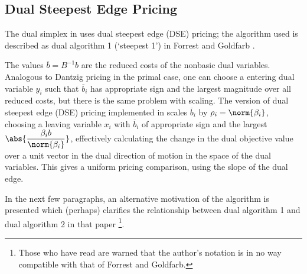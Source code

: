 \subsection{Dual Steepest Edge Pricing}
\label{sec:DSEPricing}

The dual simplex in \dylp uses dual steepest edge (DSE) pricing; the algorithm
used is described as dual algorithm 1 (`steepest 1') in
Forrest and Goldfarb \cite{For92}.

The values $\overline{b} = B^{-1}b$ are the reduced costs of the nonbasic dual
variables.
Analogous to Dantzig pricing in the primal case, one can choose a entering
dual variable $y_i$ such that $\overline{b}_i$ has appropriate sign and the
largest magnitude over all reduced costs, but there is the same problem with
scaling.
The version of dual steepest edge (DSE) pricing implemented in \dylp
scales $\overline{b}_i$ by $\rho_i = \norm{\beta_i}$,
choosing
a leaving variable $x_i$ with $\overline{b}_i$ of appropriate sign
and the largest $\displaystyle \abs{\frac{\beta_i b}{\norm{\beta_i}}}$,
effectively
calculating the change in the dual objective value over a unit vector in
the dual direction of motion in the space of the dual variables.
This gives a uniform pricing comparison, using the slope of the dual edge.

In the next few paragraphs, an alternative motivation of the algorithm is
presented which (perhaps) clarifies the relationship between dual
algorithm 1 and dual algorithm 2 in that paper%
\footnote{Those who have
read \cite{For92} are warned that the author's notation is in no way compatible
with that of Forrest and Goldfarb.}.

